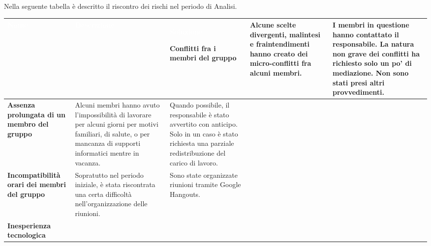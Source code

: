 Nella seguente tabella è descritto il riscontro dei rischi nel periodo di Analisi.

\renewcommand{\arraystretch}{1.5}
\def\tabularxcolumn#1{m{#1}}
\begin{tabularx}{\textwidth}{C{0.2\textwidth}XX}
    \textcolor{white}{\textbf{Nome}} &
    \textcolor{white}{\textbf{Descrizione}}&
    \textcolor{white}{\textbf{Soluzione}}%
    \endhead
    
%
%
%

%

\textbf{Conflitti fra i membri del gruppo} &

Alcune scelte divergenti, malintesi e fraintendimenti hanno creato dei micro-conflitti fra alcuni membri. &

I membri in questione hanno contattato il responsabile. La natura non grave dei conflitti ha richiesto solo un po' di mediazione. Non sono stati presi altri provvedimenti.\\
\hline

\textbf{Assenza prolungata di un membro del gruppo}&

Alcuni membri hanno avuto l'impossibilità di lavorare per alcuni giorni per motivi familiari, di salute, o per mancanza di supporti informatici mentre in vacanza.&

Quando possibile, il responsabile è stato avvertito con anticipo. Solo in un caso è stato richiesta una parziale redistribuzione del carico di lavoro.\\
\hline

\textbf{Incompatibilità orari dei membri del gruppo}&

Sopratutto nel periodo iniziale, è stata riscontrata una certa difficoltà nell'organizzazione delle riunioni.&

Sono state organizzate riunioni tramite Google Hangouts.\\
\hline

\textbf{Inesperienza tecnologica}&


\end{tabularx}
